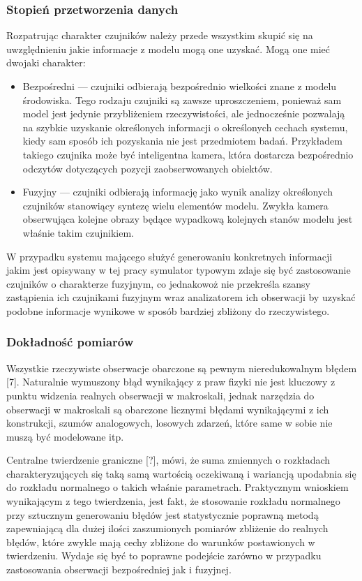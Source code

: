 {\subsubsection{Stopień przetworzenia danych}
\par{
Rozpatrując charakter czujników należy przede wszystkim skupić się na uwzględnieniu jakie informacje z modelu mogą one uzyskać. Mogą one mieć dwojaki charakter:
\begin{itemize}
\item Bezpośredni --- czujniki odbierają bezpośrednio wielkości znane z modelu środowiska. Tego rodzaju czujniki są zawsze uproszczeniem, ponieważ sam model jest jedynie przybliżeniem rzeczywistości, ale jednocześnie pozwalają na szybkie uzyskanie określonych informacji o określonych cechach systemu, kiedy sam sposób ich pozyskania nie jest przedmiotem badań. Przykładem takiego czujnika może być inteligentna kamera, która dostarcza bezpośrednio odczytów dotyczących pozycji zaobserwowanych obiektów.
\item Fuzyjny --- czujniki odbierają informację jako wynik analizy określonych czujników stanowiący syntezę wielu elementów modelu. Zwykła kamera obserwująca kolejne obrazy będące wypadkową kolejnych stanów modelu jest właśnie takim czujnikiem.
\end{itemize}
W przypadku systemu mającego służyć generowaniu konkretnych informacji jakim jest opisywany w tej pracy symulator typowym zdaje się być zastosowanie czujników o charakterze fuzyjnym, co jednakowoż nie przekreśla szansy zastąpienia ich czujnikami fuzyjnym wraz analizatorem ich obserwacji by uzyskać podobne informacje wynikowe w sposób bardziej zbliżony do rzeczywistego.

\subsubsection{Dokładność pomiarów}
\par{
Wszystkie rzeczywiste obserwacje obarczone są pewnym nieredukowalnym błędem [7]. Naturalnie wymuszony błąd wynikający z praw fizyki nie jest kluczowy z punktu widzenia realnych obserwacji w makroskali, jednak narzędzia do obserwacji w makroskali są obarczone licznymi błędami wynikającymi z ich konstrukcji, szumów analogowych, losowych zdarzeń, które same w sobie nie muszą być modelowane itp.
}
\par{
Centralne twierdzenie graniczne [?], mówi, że suma zmiennych o rozkładach charakteryzujących się taką samą wartością oczekiwaną i wariancją upodabnia się do rozkładu normalnego o takich właśnie parametrach. Praktycznym wnioskiem wynikającym z tego twierdzenia, jest fakt, że stosowanie rozkładu normalnego przy sztucznym generowaniu błędów jest statystycznie poprawną metodą zapewniającą dla dużej ilości zaszumionych pomiarów zbliżenie do realnych błędów, które zwykle mają cechy zbliżone do warunków postawionych w twierdzeniu. Wydaje się być to poprawne podejście zarówno w przypadku zastosowania obserwacji bezpośredniej jak i fuzyjnej.
}

}}
